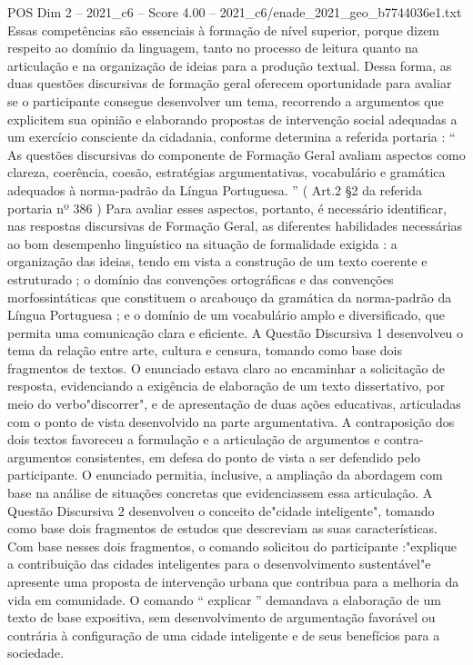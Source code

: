 \begin{textsample}{POS Dim 2 – 2021\_c6 – Score 4.00 – 2021\_c6/enade\_2021\_geo\_b7744036e1.txt}
Essas competências são essenciais à formação de nível superior, porque dizem respeito ao domínio da linguagem, tanto no processo de leitura quanto na articulação e na organização de ideias para a produção textual.
Dessa forma, as duas questões discursivas de formação geral oferecem oportunidade para avaliar se o participante consegue desenvolver um tema, recorrendo a argumentos que explicitem sua opinião e elaborando propostas de intervenção social adequadas a um exercício consciente da cidadania, conforme determina a referida portaria : “ As questões discursivas do componente de Formação Geral avaliam aspectos como clareza, coerência, coesão, estratégias argumentativas, vocabulário e gramática adequados à norma-padrão da Língua Portuguesa. ” ( Art.2 §2 da referida portaria nº 386 ) Para avaliar esses aspectos, portanto, é necessário identificar, nas respostas discursivas de Formação Geral, as diferentes habilidades necessárias ao bom desempenho linguístico na situação de formalidade exigida : a organização das ideias, tendo em vista a construção de um texto coerente e estruturado ; o domínio das convenções ortográficas e das convenções morfossintáticas que constituem o arcabouço da gramática da norma-padrão da Língua Portuguesa ; e o domínio de um vocabulário amplo e diversificado, que permita uma comunicação clara e eficiente.
A Questão Discursiva 1 desenvolveu o tema da relação entre arte, cultura e censura, tomando como base dois fragmentos de textos.
O enunciado estava claro ao encaminhar a solicitação de resposta, evidenciando a exigência de elaboração de um texto dissertativo, por meio do verbo"discorrer", e de apresentação de duas ações educativas, articuladas com o ponto de vista desenvolvido na parte argumentativa.
A contraposição dos dois textos favoreceu a formulação e a articulação de argumentos e contra-argumentos consistentes, em defesa do ponto de vista a ser defendido pelo participante.
O enunciado permitia, inclusive, a ampliação da abordagem com base na análise de situações concretas que evidenciassem essa articulação.
A Questão Discursiva 2 desenvolveu o conceito de"cidade inteligente", tomando como base dois fragmentos de estudos que descreviam as suas características.
Com base nesses dois fragmentos, o comando solicitou do participante :"explique a contribuição das cidades inteligentes para o desenvolvimento sustentável"e apresente uma proposta de intervenção urbana que contribua para a melhoria da vida em comunidade.
O comando “ explicar ” demandava a elaboração de um texto de base expositiva, sem desenvolvimento de argumentação favorável ou contrária à configuração de uma cidade inteligente e de seus benefícios para a sociedade.

\end{textsample}

